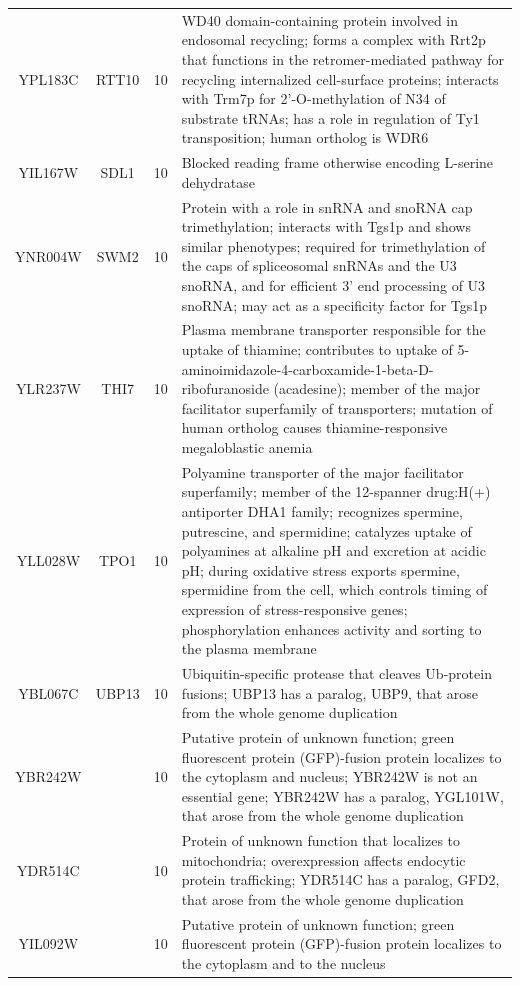 \documentclass[]{article}
\begin{document}
\begin{longtable}{@{\extracolsep{3pt}} cccp{85mm}}
		YPL183C & RTT10 & 10 & WD40 domain-containing protein involved in endosomal recycling; forms a complex with Rrt2p that functions in the retromer-mediated pathway for recycling internalized cell-surface proteins; interacts with Trm7p for 2'-O-methylation of N34 of substrate tRNAs; has a role in regulation of Ty1 transposition; human ortholog is WDR6 \\ 
		YIL167W & SDL1 & 10 & Blocked reading frame otherwise encoding L-serine dehydratase \\ 
		YNR004W & SWM2 & 10 & Protein with a role in snRNA and snoRNA cap trimethylation; interacts with Tgs1p and shows similar phenotypes; required for trimethylation of the caps of spliceosomal snRNAs and the U3 snoRNA, and for efficient 3' end processing of U3 snoRNA; may act as a specificity factor for Tgs1p \\ 
		YLR237W & THI7 & 10 & Plasma membrane transporter responsible for the uptake of thiamine; contributes to uptake of 5-aminoimidazole-4-carboxamide-1-beta-D-ribofuranoside (acadesine); member of the major facilitator superfamily of transporters; mutation of human ortholog causes thiamine-responsive megaloblastic anemia \\ 
		YLL028W & TPO1 & 10 & Polyamine transporter of the major facilitator superfamily; member of the 12-spanner drug:H(+) antiporter DHA1 family; recognizes spermine, putrescine, and spermidine; catalyzes uptake of polyamines at alkaline pH and excretion at acidic pH; during oxidative stress exports spermine, spermidine from the cell, which controls timing of expression of stress-responsive genes; phosphorylation enhances activity and sorting to the plasma membrane \\ 
		YBL067C & UBP13 & 10 & Ubiquitin-specific protease that cleaves Ub-protein fusions; UBP13 has a paralog, UBP9, that arose from the whole genome duplication \\ 
		YBR242W &  & 10 & Putative protein of unknown function; green fluorescent protein (GFP)-fusion protein localizes to the cytoplasm and nucleus; YBR242W is not an essential gene; YBR242W has a paralog, YGL101W, that arose from the whole genome duplication \\ 
		YDR514C &  & 10 & Protein of unknown function that localizes to mitochondria; overexpression affects endocytic protein trafficking; YDR514C has a paralog, GFD2, that arose from the whole genome duplication \\ 
		YIL092W &  & 10 & Putative protein of unknown function; green fluorescent protein (GFP)-fusion protein localizes to the cytoplasm and to the nucleus \\ 

\end{longtable}
\end{document}
